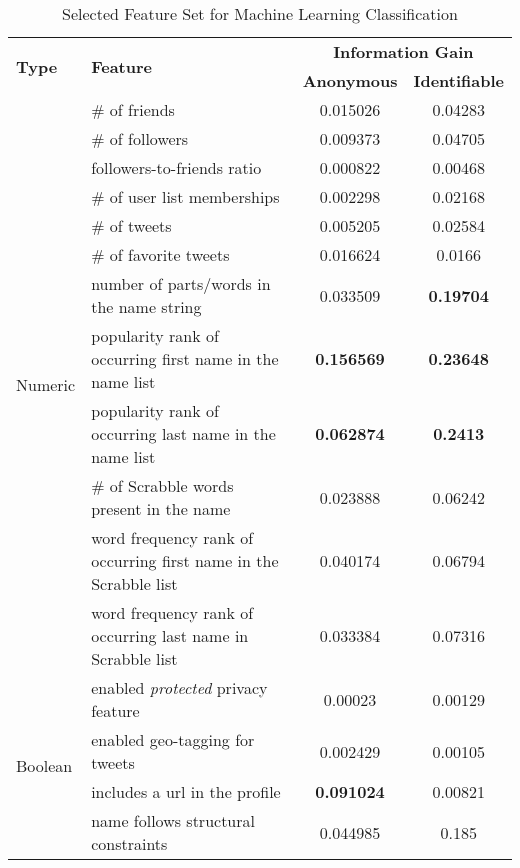 \documentclass[conference]{IEEEtran}
\begin{document}
\begin{table*}[thb]
\small
\begin{center}
\caption{Selected Feature Set for Machine Learning Classification}
\label{tab:features}
\begin{tabular}{| l | p{7cm}| c | c |}
\hline
\multirow{2}{*}{\textbf{Type}} & \multirow{2}{*}{\textbf{Feature}} & \multicolumn{2}{c|}{\textbf{Information Gain}} \\
\cline{3-4}
 &  & \textbf{Anonymous} & \textbf{Identifiable} \\
\hline
\multirow{12}{*}{Numeric} & \# of friends & 0.015026 & 0.04283\\
\cline{2-4}
 & \# of followers  & 0.009373 & 0.04705\\
\cline{2-4}
 & followers-to-friends ratio & 0.000822 & 0.00468\\
\cline{2-4}
 & \# of user list memberships & 0.002298 & 0.02168\\
\cline{2-4}
 & \# of tweets & 0.005205 & 0.02584\\
\cline{2-4}
 & \# of favorite tweets & 0.016624 & 0.0166\\
\cline{2-4}
 & number of parts/words in the name string & 0.033509 & \textbf{0.19704}\\
\cline{2-4}
 & popularity rank of occurring first name in the name list & \textbf{0.156569} & \textbf{0.23648} \\
\cline{2-4}
 & popularity rank of occurring last name in the name list & \textbf{0.062874} & \textbf{0.2413}\\
\cline{2-4}
 & \# of Scrabble words present in the name & 0.023888 & 0.06242\\
\cline{2-4}
 & word frequency rank of occurring first name in the Scrabble list & 0.040174 & 0.06794\\
\cline{2-4}
 & word frequency rank of occurring last name in Scrabble list & 0.033384 & 0.07316\\
\hline
\hline 
\multirow{4}{*}{Boolean} & enabled \textit{protected} privacy feature & 0.00023 & 0.00129\\
\cline{2-4}
& enabled geo-tagging for tweets & 0.002429 & 0.00105\\
\cline{2-4}
& includes a url in the profile & \textbf{0.091024} & 0.00821\\
\cline{2-4}
& name follows structural constraints & 0.044985 & 0.185\\
\hline
\end{tabular}
\end{center}
\vspace{-1.5em}
\end{table*}
\end{document}
